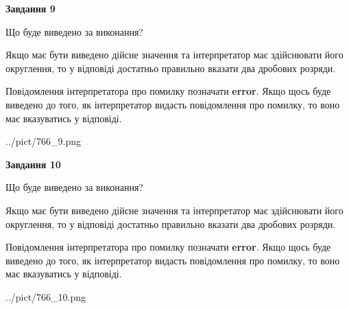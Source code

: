 \documentclass[12pt, ukrainian]{article}
\begin{document}
{\begin {Large}
{\begin {center}\textbf{Завдання 9}\end {center}}\par
Що буде виведено за виконання? \par

Якщо має бути виведено дійсне значення та інтерпретатор має здійснювати його округлення, 
то у відповіді достатньо правильно вказати два дробових розряди.

Повідомлення інтерпретатора про помилку позначати \textbf{error}.
Якщо щось буде виведено до того, як інтерпретатор видасть повідомлення про помилку, 
то воно має вказуватись у відповіді. \par

\begin{center}
	{../pict/766_9.png}
\end{center}
\newpage

{\begin {center}\textbf{Завдання 10}\end {center}}\par
Що буде виведено за виконання? \par

Якщо має бути виведено дійсне значення та інтерпретатор має здійснювати його округлення, 
то у відповіді достатньо правильно вказати два дробових розряди.

Повідомлення інтерпретатора про помилку позначати \textbf{error}.
Якщо щось буде виведено до того, як інтерпретатор видасть повідомлення про помилку, 
то воно має вказуватись у відповіді. \par

\begin{center}
	{../pict/766_10.png}
\end{center}
\newpage

\end {Large}}
\end{document}
